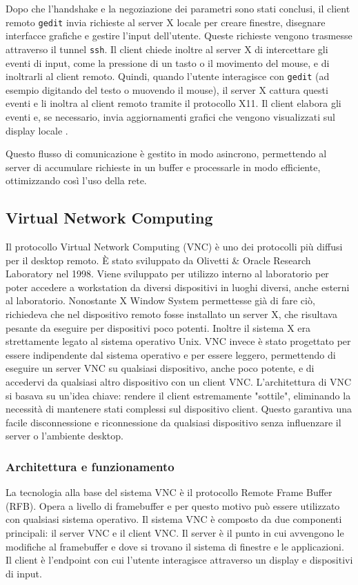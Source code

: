 \documentclass[12pt,a4paper,openright,twoside]{book}
\begin{document}
Dopo che l'handshake e la negoziazione dei parametri sono stati conclusi, il client remoto \texttt{gedit} invia richieste al server X locale per creare finestre, disegnare interfacce grafiche e gestire l'input dell'utente. Queste richieste vengono trasmesse attraverso il tunnel \texttt{ssh}. Il client chiede inoltre al server X di intercettare gli eventi di input, come la pressione di un tasto o il movimento del mouse, e di inoltrarli al client remoto. Quindi, quando l'utente interagisce con \texttt{gedit} (ad esempio digitando del testo o muovendo il mouse), il server X cattura questi eventi e li inoltra al client remoto tramite il protocollo X11. Il client elabora gli eventi e, se necessario, invia aggiornamenti grafici che vengono visualizzati sul display locale \cite{coopersmith2024x}.

Questo flusso di comunicazione è gestito in modo asincrono, permettendo al server di accumulare richieste in un buffer e processarle in modo efficiente, ottimizzando così l'uso della rete.



\subsection{Virtual Network Computing}

Il protocollo Virtual Network Computing (VNC) è uno dei protocolli più diffusi per il desktop remoto. È stato sviluppato da Olivetti \& Oracle Research Laboratory nel 1998.
Viene sviluppato per utilizzo interno al laboratorio per poter accedere a workstation da diversi dispositivi in luoghi diversi, anche esterni al laboratorio. Nonostante X Window System permettesse già di fare ciò, richiedeva che nel dispositivo remoto fosse installato un server X, che risultava pesante da eseguire per dispositivi poco potenti. Inoltre il sistema X era strettamente legato al sistema operativo Unix.
VNC invece è stato progettato per essere indipendente dal sistema operativo e per essere leggero, permettendo di eseguire un server VNC su qualsiasi dispositivo, anche poco potente, e di accedervi da qualsiasi altro dispositivo con un client VNC.
L'architettura di VNC si basava su un'idea chiave: rendere il client estremamente "sottile", eliminando la necessità di mantenere stati complessi sul dispositivo client. Questo garantiva una facile disconnessione e riconnessione da qualsiasi dispositivo senza influenzare il server o l'ambiente desktop.

\subsubsection{Architettura e funzionamento}
La tecnologia alla base del sistema VNC è il protocollo Remote Frame Buffer (RFB). Opera a livello di framebuffer e per questo motivo può essere utilizzato con qualsiasi sistema operativo.
Il sistema VNC è composto da due componenti principali: il server VNC e il client VNC. Il server è il punto in cui avvengono le modifiche al framebuffer e dove si trovano il sistema di finestre e le applicazioni. Il client è l'endpoint con cui l'utente interagisce attraverso un display e dispositivi di input.
\end{document}
